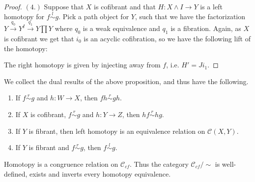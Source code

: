 \documentclass[../thesis.tex]{subfiles}
\begin{document}
\begin{proof}
                $(4.)$ Suppose that $X$ is cofibrant and that $H:X\wedge I\rightarrow Y$ is a left homotopy for $f \overset{l}{\sim} g$. Pick a path object for $Y$, such that we have the factorization $Y\overset{q_0}{\rightarrow}Y^I\overset{q_1}{\rightarrow}Y\prod Y$ where $q_0$ is a weak equivalence and $q_1$ is a fibration. Again, as $X$ is cofibrant we get that $i_0$ is an acyclic cofibration, so we have the following lift of the homotopy:
                \begin{center}
                \end{center}
                The right homotopy is given by injecting away from $f$, i.e. $H' = Ji_1$.
            \end{proof}

            \begin{corollary}\label{cor: basic-homotopy-op}
                We collect the dual results of the above proposition, and thus have the following.
                \begin{enumerate}
                    \item If $f \overset{r}{\sim}g$ and $h: W \rightarrow X$, then $fh \overset{r}{\sim} gh$.
                    \item If $X$ is cofibrant, $f \overset{r}{\sim} g$ and $h: Y \rightarrow Z$, then $hf \overset{r}{\sim} hg$.
                    \item If $Y$ is fibrant, then left homotopy is an equivalence relation on $\mathcal{C}(X,Y)$.
                    \item If $Y$ is fibrant and $f \overset{r}{\sim} g$, then $f \overset{l}{\sim} g$.
                \end{enumerate}
            \end{corollary}

            \begin{corollary}\label{cor: homotopy-is-eq-rel}
                Homotopy is a congruence relation on $\mathcal{C}_{cf}$. Thus the category $\mathcal{C}_{cf}/\sim$ is well-defined, exists and inverts every homotopy equivalence.
            \end{corollary}
\end{document}
